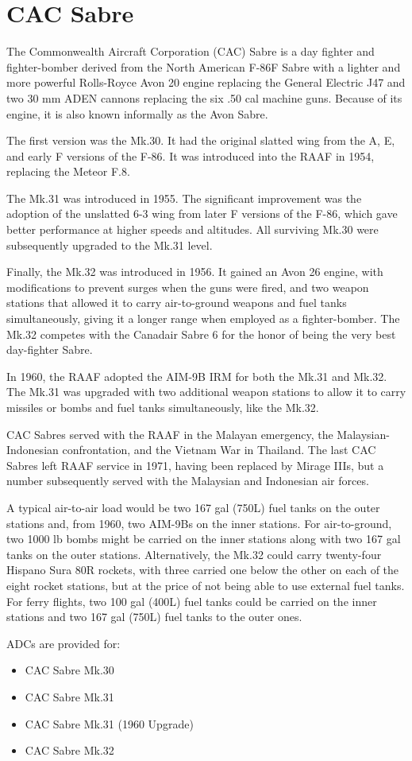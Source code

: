 \section*{CAC Sabre}

The Commonwealth Aircraft Corporation (CAC) Sabre is a day fighter and fighter-bomber derived from the North American F-86F Sabre with a lighter and more powerful Rolls-Royce Avon 20 engine replacing the General Electric J47 and two 30 mm ADEN cannons replacing the six .50 cal machine guns. Because of its engine, it is also known informally as the Avon Sabre. 

The first version was the Mk.30. It had the original slatted wing from the A, E, and early F versions of the F-86. It was introduced into the RAAF in 1954, replacing the Meteor F.8.

The Mk.31 was introduced in 1955. The significant improvement was the adoption of the unslatted 6-3 wing from later F versions of the F-86, which gave better performance at higher speeds and altitudes. All surviving Mk.30 were subsequently upgraded to the Mk.31 level. 

Finally, the Mk.32 was introduced in 1956. It gained an Avon 26 engine, with modifications to prevent surges when the guns were fired, and two weapon stations that allowed it to carry air-to-ground weapons and fuel tanks simultaneously, giving it a longer range when employed as a fighter-bomber. The Mk.32 competes with the Canadair Sabre 6 for the honor of being the very best day-fighter Sabre.

In 1960, the RAAF adopted the AIM-9B IRM for both the Mk.31 and Mk.32. The Mk.31 was upgraded with two additional weapon stations to allow it to carry missiles or bombs and fuel tanks simultaneously, like the Mk.32.

CAC Sabres served with the RAAF in the Malayan emergency, the Malaysian-Indonesian confrontation, and the Vietnam War in Thailand. The last CAC Sabres left RAAF service in 1971, having been replaced by Mirage IIIs, but a number subsequently served with the Malaysian and Indonesian air forces.

A typical air-to-air load would be two 167 gal (750L) fuel tanks on the outer stations and, from 1960, two AIM-9Bs on the inner stations. For air-to-ground, two 1000 lb bombs might be carried on the inner stations along with two 167 gal tanks on the outer stations. Alternatively, the Mk.32 could carry twenty-four Hispano Sura 80R rockets, with three carried one below the other on each of the eight rocket stations, but at the price of not being able to use external fuel tanks. For ferry flights, two 100 gal (400L) fuel tanks could be carried on the inner stations and two 167 gal (750L) fuel tanks to the outer ones.

ADCs are provided for:
\begin{itemize}
\item CAC Sabre Mk.30
\item CAC Sabre Mk.31
\item CAC Sabre Mk.31 (1960 Upgrade)
\item CAC Sabre Mk.32
\end{itemize}
